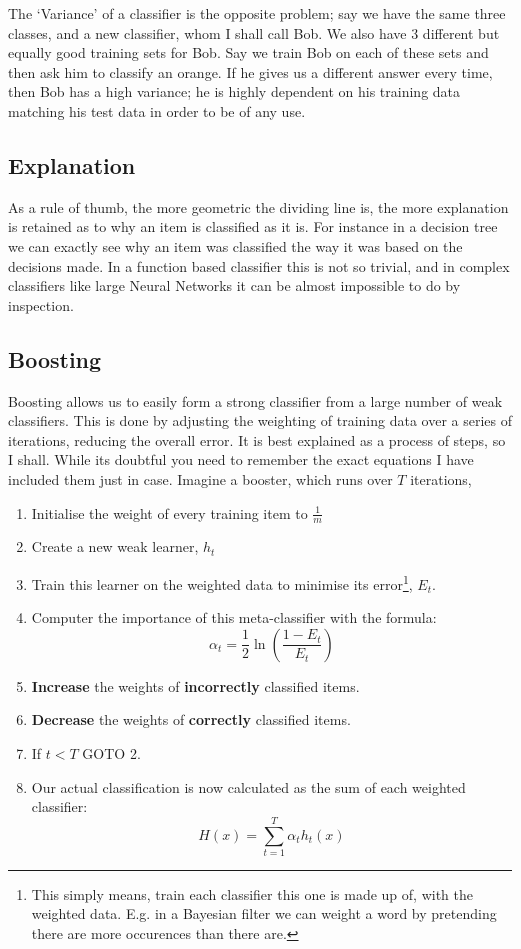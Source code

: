 \documentclass{article}
\begin{document}
        The `Variance' of a classifier is the opposite problem; say we have the same three classes, and a new classifier, whom I shall call Bob. We also have 3 different but equally good training sets for Bob. Say we train Bob on each of these sets and then ask him to classify an orange. If he gives us a different answer every time, then Bob has a high variance; he is highly dependent on his training data matching his test data in order to be of any use.
        
    \subsection{Explanation}
        
        As a rule of thumb, the more geometric the dividing line is, the more explanation is retained as to why an item is classified as it is. For instance in a decision tree we can exactly see why an item was classified the way it was based on the decisions made. In a function based classifier this is not so trivial, and in complex classifiers like large Neural Networks it can be almost impossible to do by inspection.

    \subsection{Boosting}
        Boosting allows us to easily form a strong classifier from a large number of weak classifiers. This is done by adjusting the weighting of training data over a series of iterations, reducing the overall error. It is best explained as a process of steps, so I shall. While its doubtful you need to remember the exact equations I have included them just in case. Imagine a booster, which runs over $T$ iterations,
        
        \begin{enumerate}
            \item Initialise the weight of every training item to $\frac{1}{m}$
            \item Create a new weak learner, $h_t$
            \item Train this learner on the weighted data to minimise its error\footnote{This simply means, train each classifier this one is made up of, with the weighted data. E.g. in a Bayesian filter we can weight a word by pretending there are more occurences than there are.}, $E_t$.
            \item Computer the importance of this meta-classifier with the formula:
                $$ \alpha_t = \frac{1}{2} \ln{\left (\frac{1-E_t}{E_t}\right )}$$
            \item \textbf{Increase} the weights of \textbf{incorrectly} classified items.
            \item \textbf{Decrease} the weights of \textbf{correctly} classified items.
            \item If $t < T$ GOTO 2.
            \item Our actual classification is now calculated as the sum of each weighted classifier:
                $$ H(x) = \sum\limits_{t=1}^T \alpha_t h_t(x) $$
        \end{enumerate}
        
\end{document}
